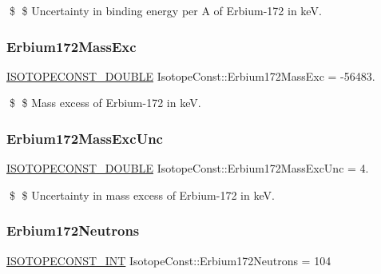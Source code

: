 \$ \$ Uncertainty in binding energy per A of Erbium-\/172 in keV. \mbox{\label{group___isotope_const-_erbium-_er172_ga1888d9ebc7ef469c25637feee0a0050b}} 
\subsubsection{\texorpdfstring{Erbium172\+Mass\+Exc}{Erbium172MassExc}}
{\footnotesize\ttfamily \mbox{\hyperlink{group___isotope_const-_macros_ga8f45a7272ce02c0b4c65c44636ed719a}{I\+S\+O\+T\+O\+P\+E\+C\+O\+N\+S\+T\+\_\+\+D\+O\+U\+B\+LE}} Isotope\+Const\+::\+Erbium172\+Mass\+Exc = -\/56483.}

\$ \$ Mass excess of Erbium-\/172 in keV. \mbox{\label{group___isotope_const-_erbium-_er172_gad0dbd52b92698ef3abdabd0702c92474}} 
\subsubsection{\texorpdfstring{Erbium172\+Mass\+Exc\+Unc}{Erbium172MassExcUnc}}
{\footnotesize\ttfamily \mbox{\hyperlink{group___isotope_const-_macros_ga8f45a7272ce02c0b4c65c44636ed719a}{I\+S\+O\+T\+O\+P\+E\+C\+O\+N\+S\+T\+\_\+\+D\+O\+U\+B\+LE}} Isotope\+Const\+::\+Erbium172\+Mass\+Exc\+Unc = 4.}

\$ \$ Uncertainty in mass excess of Erbium-\/172 in keV. \mbox{\label{group___isotope_const-_erbium-_er172_ga102d35b3aab884bdb187670c5e0197d5}} 
\subsubsection{\texorpdfstring{Erbium172\+Neutrons}{Erbium172Neutrons}}
{\footnotesize\ttfamily \mbox{\hyperlink{group___isotope_const-_macros_ga5f18360b3e99483a35c32d789e62621c}{I\+S\+O\+T\+O\+P\+E\+C\+O\+N\+S\+T\+\_\+\+I\+NT}} Isotope\+Const\+::\+Erbium172\+Neutrons = 104}

